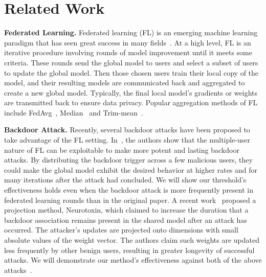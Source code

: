 \documentclass{article} %
\begin{document}
%
\vspace{-5pt}
\section{Related Work}
\vspace{-5pt}

\textbf{Federated Learning.} Federated learning (FL) is an emerging machine learning paradigm that has seen great success in many fields~\citep{ryffel2018generic,hard2018federated,bonawitz2019towards}. At a high level, FL is an iterative procedure involving rounds of model improvement until it meets some criteria. These rounds send the global model to users and select a subset of users to update the global model. Then those chosen users train their local copy of the model, and their resulting models are communicated back and aggregated to create a new global model. Typically, the final local model's gradients or weights are transmitted back to ensure data privacy. Popular aggregation methods of FL include FedAvg~\citep{fedavg}, Median~\citep{yin2018byzantine} and Trim-mean~\citep{yin2018byzantine}.

\textbf{Backdoor Attack.} Recently, several backdoor attacks have been proposed to take advantage of the FL setting. In~\cite{dba}, the authors show that the multiple-user nature of FL can be exploitable to make more potent and lasting backdoor attacks. By distributing the backdoor trigger across a few malicious users, they could make the global model exhibit the desired behavior at higher rates and for many iterations after the attack had concluded. We will show our threshold's effectiveness holds even when the backdoor attack is more frequently present in federated learning rounds than in the original paper. A recent work~\citep{neurotoxin} proposed a projection method, Neurotoxin, which claimed to increase the duration that a backdoor association remains present in the shared model after an attack has occurred. The attacker's updates are projected onto dimensions with small absolute values of the weight vector. The authors claim such weights are updated less frequently by other benign users, resulting in greater longevity of successful attacks. We will demonstrate our method's effectiveness against both of the above attacks~\citep{dba, neurotoxin}.
\end{document}

